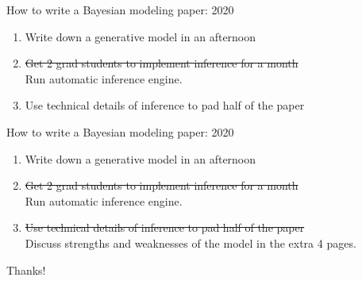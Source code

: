 \begin{frame}{How to write a Bayesian modeling paper: 2020}
  \begin{block}{}
    \begin{enumerate}
      \item Write down a generative model in an afternoon
      \vspace{\baselineskip}
      \vspace{\baselineskip}
      \item \sout{Get 2 grad students to implement inference for a month} 
      \\ Run automatic inference engine.
      \vspace{\baselineskip}
      \vspace{\baselineskip}
      \item Use technical details of inference to pad half of the paper
    \end{enumerate}
  \end{block}
\end{frame}

\begin{frame}{How to write a Bayesian modeling paper: 2020}
  \begin{block}{}
    \begin{enumerate}
      \item Write down a generative model in an afternoon
      \vspace{\baselineskip}
      \vspace{\baselineskip}
      \item \sout{Get 2 grad students to implement inference for a month} 
      \\Run automatic inference engine.
      \vspace{\baselineskip}
      \vspace{\baselineskip}
      \item \sout{Use technical details of inference to pad half of the paper}
      \\ Discuss strengths and weaknesses of the model in the extra 4 pages.
    \end{enumerate}
  \end{block}
  \pause
  Thanks!
\end{frame}


